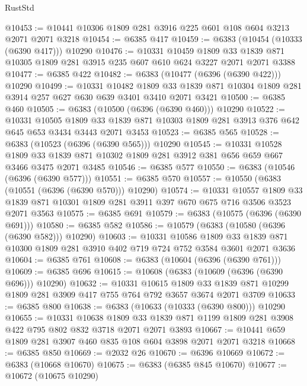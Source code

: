 \begin{lexlean}{RustStd}
\begin{coremodule}
@10453 := @10441 @10306 @1809 @281 @3916 @225 @601 @108 @604 @3213 @2071 @2071 @3218
@10454 := @6385 @417
@10459 := @6383 (@10454 (@10333 (@6390 @417))) @10290
@10476 := @10331
    @10459
    @1809
    @33
    @1839
    @871
    @10305
    @1809
    @281
    @3915
    @235
    @607
    @610
    @624
    @3227
    @2071
    @2071
    @3388
@10477 := @6385 @422
@10482 := @6383 (@10477 (@6396 (@6390 @422))) @10290
@10499 := @10331
    @10482
    @1809
    @33
    @1839
    @871
    @10304
    @1809
    @281
    @3914
    @257
    @627
    @630
    @639
    @3401
    @3410
    @2071
    @3421
@10500 := @6385 @460
@10505 := @6383 (@10500 (@6396 (@6390 @460))) @10290
@10522 := @10331
    @10505
    @1809
    @33
    @1839
    @871
    @10303
    @1809
    @281
    @3913
    @376
    @642
    @645
    @653
    @3434
    @3443
    @2071
    @3453
@10523 := @6385 @565
@10528 := @6383 (@10523 (@6396 (@6390 @565))) @10290
@10545 := @10331
    @10528
    @1809
    @33
    @1839
    @871
    @10302
    @1809
    @281
    @3912
    @381
    @656
    @659
    @667
    @3466
    @3475
    @2071
    @3485
@10546 := @6385 @577
@10550 := @6383 (@10546 (@6396 (@6390 @577)))
@10551 := @6385 @570
@10557 := @10550 (@6383 (@10551 (@6396 (@6390 @570))) @10290)
@10574 := @10331
    @10557
    @1809
    @33
    @1839
    @871
    @10301
    @1809
    @281
    @3911
    @397
    @670
    @675
    @716
    @3506
    @3523
    @2071
    @3563
@10575 := @6385 @691
@10579 := @6383 (@10575 (@6396 (@6390 @691)))
@10580 := @6385 @582
@10586 := @10579 (@6383 (@10580 (@6396 (@6390 @582))) @10290)
@10603 := @10331
    @10586
    @1809
    @33
    @1839
    @871
    @10300
    @1809
    @281
    @3910
    @402
    @719
    @724
    @752
    @3584
    @3601
    @2071
    @3636
@10604 := @6385 @761
@10608 := @6383 (@10604 (@6396 (@6390 @761)))
@10609 := @6385 @696
@10615 := @10608 (@6383 (@10609 (@6396 (@6390 @696))) @10290)
@10632 := @10331
    @10615
    @1809
    @33
    @1839
    @871
    @10299
    @1809
    @281
    @3909
    @417
    @755
    @764
    @792
    @3657
    @3674
    @2071
    @3709
@10633 := @6385 @800
@10638 := @6383 (@10633 (@10333 (@6390 @800))) @10290
@10655 := @10331
    @10638
    @1809
    @33
    @1839
    @871
    @1199
    @1809
    @281
    @3908
    @422
    @795
    @802
    @832
    @3718
    @2071
    @2071
    @3893
@10667 := @10441 @659 @1809 @281 @3907 @460 @835 @108 @604 @3898 @2071 @2071 @3218
@10668 := @6385 @850
@10669 := @2032 @26
@10670 := @6396 @10669
@10672 := @6383 (@10668 @10670)
@10675 := @6383 (@6385 @845 @10670)
@10677 := @10672 (@10675 @10290)

\end{coremodule}
\end{lexlean}
